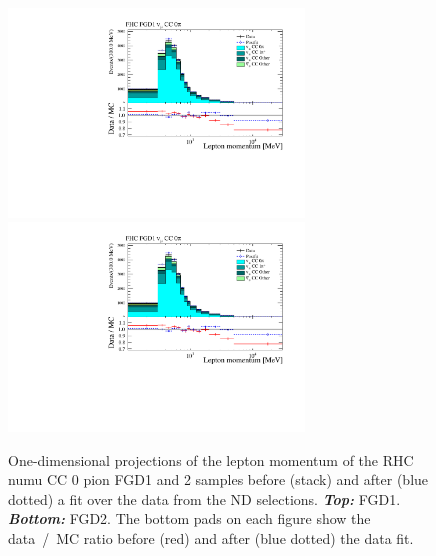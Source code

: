 \begin{figure}[ht]
  \center
  \includegraphics[keepaspectratio=true,width=0.7\textwidth,page=13]{images/BANFF/reactionCodeStacks_PrefitAndPostfit_mom.pdf} \\
  \includegraphics[keepaspectratio=true,width=0.7\textwidth,page=16]{images/BANFF/reactionCodeStacks_PrefitAndPostfit_mom.pdf} \\
  \begin{center}
    \caption[RHC $\nu_\mu$ CC 0 pion FGD1 and 2 samples before and
    after a fit over the data from the ND280
    selections]{One-dimensional projections of the lepton momentum of
      the \Gls{RHC} \Gls{numu} \Gls{CC} 0 pion \Gls{FGD}1 and 2
      samples before (stack) and after (blue dotted) a fit over the
      data from the \Gls{ND} selections. \textbf{\textit{Top:}}
      \Gls{FGD}1. \textbf{\textit{Bottom:}} \Gls{FGD}2. The bottom
      pads on each figure show the data~/~\Gls{MC} ratio before (red)
      and after (blue dotted) the data fit.}
    \label{fig:numubkgCC0Pi}
  \end{center}
\end{figure}


